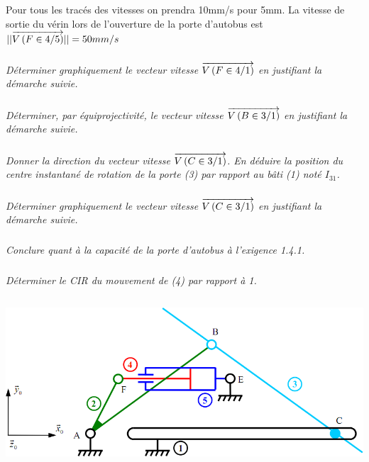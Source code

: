 \documentclass[10pt,fleqn]{article} %
\begin{document}
\begin{multicols}{2}
Pour tous les tracés des vitesses on prendra 10mm/s pour 5mm.
 La vitesse de sortie du vérin lors de l'ouverture de la porte d'autobus est $||\overrightarrow{V\left( {F} \in {4}/{5}\right)}||=50mm/s$

\subparagraph{}
\textit{Déterminer graphiquement le vecteur vitesse $\overrightarrow{V\left( {F} \in {4}/{1}\right)}$ en justifiant la démarche suivie. }

\subparagraph{}
\textit{Déterminer, par équiprojectivité, le vecteur vitesse $\overrightarrow{V\left( {B} \in {3}/{1}\right)}$ en justifiant la démarche suivie.}

\subparagraph{}
\textit{Donner la direction du vecteur vitesse $\overrightarrow{V\left( {C} \in {3}/{1}\right)}$. En déduire la position du centre instantané de rotation de la porte (3) par rapport au bâti (1) noté $I_{31}$.}

\subparagraph{}
\textit{Déterminer graphiquement le vecteur vitesse $\overrightarrow{V\left( {C} \in {3}/{1}\right)}$ en justifiant la démarche suivie.}

\subparagraph{}
\textit{Conclure quant à la capacité de  la porte d'autobus à l'exigence 1.4.1.}

\subparagraph{}
\textit{Déterminer le CIR du mouvement de (4) par rapport à 1.}



%
%
%
\end{multicols}

\newpage

$$\quad$$

\vspace{15cm}

\begin{center}
\includegraphics[width=.8\textwidth]{images/fig7}
\end{center}
\end{document}
